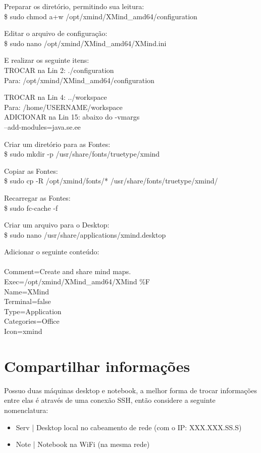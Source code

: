 \documentclass[a4paper,11pt]{article}
\begin{document}
Preparar os diretório, permitindo sua leitura: \\
{\ttfamily\$ sudo chmod a+w /opt/xmind/XMind\_amd64/configuration}

Editar o arquivo de configuração: \\
{\ttfamily\$ sudo nano /opt/xmind/XMind\_amd64/XMind.ini}

E realizar os seguinte itens: \\
{\ttfamily TROCAR na Lin 2: ./configuration} \\
{\ttfamily Para: /opt/xmind/XMind\_amd64/configuration}

{\ttfamily TROCAR na Lin 4: ../workspace} \\
{\ttfamily Para: /home/USERNAME/workspace} \\
{\ttfamily ADICIONAR na Lin 15: abaixo do -vmargs} \\
{\ttfamily --add-modules=java.se.ee}

Criar um diretório para as Fontes: \\
{\ttfamily\$ sudo mkdir -p /usr/share/fonts/truetype/xmind}

Copiar as Fontes: \\
{\ttfamily\$ sudo cp -R /opt/xmind/fonts/* /usr/share/fonts/truetype/xmind/}

Recarregar as Fontes: \\
{\ttfamily\$ sudo fc-cache -f}

Criar um arquivo para o Desktop: \\
{\ttfamily\$ sudo nano /usr/share/applications/xmind.desktop}

Adicionar o seguinte conteúdo: \\
{ \\ 
	Comment=Create and share mind maps. \\ 
	Exec=/opt/xmind/XMind\_amd64/XMind \%F \\ 
	Name=XMind \\ 
	Terminal=false \\ 
	Type=Application \\ 
	Categories=Office \\ 
	Icon=xmind}

\section{Compartilhar informações}
Possuo duas máquinas desktop e notebook, a melhor forma de trocar informações entre elas é através de uma conexão SSH, então considere a seguinte nomenclatura:
\begin{itemize}[noitemsep]
	\item Serv | Desktop local no cabeamento de rede (com o IP: XXX.XXX.SS.S) 
	\item Note | Notebook na WiFi (na mesma rede)
\end{itemize}
\end{document}
